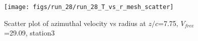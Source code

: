 \begin{figure}[H]
\centering
\texttt{[image: figs/run\_28/run\_28\_T\_vs\_r\_mesh\_scatter]}
\caption{Scatter plot of azimuthal velocity vs radius at $z/c$=7.75, $V_{free}$=29.09, station3}
\label{fig:run_28_T_vs_r_mesh_scatter}
\end{figure}


